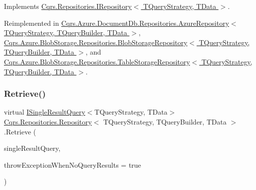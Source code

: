 Implements \hyperlink{interfaceCqrs_1_1Repositories_1_1IRepository_ae545451c48d1e2b5693db73e169e100d_ae545451c48d1e2b5693db73e169e100d}{Cqrs.\+Repositories.\+I\+Repository$<$ T\+Query\+Strategy, T\+Data $>$}.



Reimplemented in \hyperlink{classCqrs_1_1Azure_1_1DocumentDb_1_1Repositories_1_1AzureRepository_a22c58163e101a6cb80f891bed6114380_a22c58163e101a6cb80f891bed6114380}{Cqrs.\+Azure.\+Document\+Db.\+Repositories.\+Azure\+Repository$<$ T\+Query\+Strategy, T\+Query\+Builder, T\+Data $>$}, \hyperlink{classCqrs_1_1Azure_1_1BlobStorage_1_1Repositories_1_1BlobStorageRepository_a7c5a3ca4d92cf4954508fb3e583eb49e_a7c5a3ca4d92cf4954508fb3e583eb49e}{Cqrs.\+Azure.\+Blob\+Storage.\+Repositories.\+Blob\+Storage\+Repository$<$ T\+Query\+Strategy, T\+Query\+Builder, T\+Data $>$}, and \hyperlink{classCqrs_1_1Azure_1_1BlobStorage_1_1Repositories_1_1TableStorageRepository_a7238452f19c9d51b5733df7701920605_a7238452f19c9d51b5733df7701920605}{Cqrs.\+Azure.\+Blob\+Storage.\+Repositories.\+Table\+Storage\+Repository$<$ T\+Query\+Strategy, T\+Query\+Builder, T\+Data $>$}.

\mbox{\label{classCqrs_1_1Repositories_1_1Repository_a4f83093a92d8141cdc2b908bbbd97f32_a4f83093a92d8141cdc2b908bbbd97f32}} 
\subsubsection{\texorpdfstring{Retrieve()}{Retrieve()}\hspace{0.1cm}{\footnotesize\ttfamily [1/2]}}
{\footnotesize\ttfamily virtual \hyperlink{interfaceCqrs_1_1Repositories_1_1Queries_1_1ISingleResultQuery}{I\+Single\+Result\+Query}$<$T\+Query\+Strategy, T\+Data$>$ \hyperlink{classCqrs_1_1Repositories_1_1Repository}{Cqrs.\+Repositories.\+Repository}$<$ T\+Query\+Strategy, T\+Query\+Builder, T\+Data $>$.Retrieve (\begin{DoxyParamCaption}\item[{\hyperlink{interfaceCqrs_1_1Repositories_1_1Queries_1_1ISingleResultQuery}{I\+Single\+Result\+Query}$<$ T\+Query\+Strategy, T\+Data $>$}]{single\+Result\+Query,  }\item[{bool}]{throw\+Exception\+When\+No\+Query\+Results = {\ttfamily true} }\end{DoxyParamCaption})\hspace{0.3cm}{\ttfamily [virtual]}}



